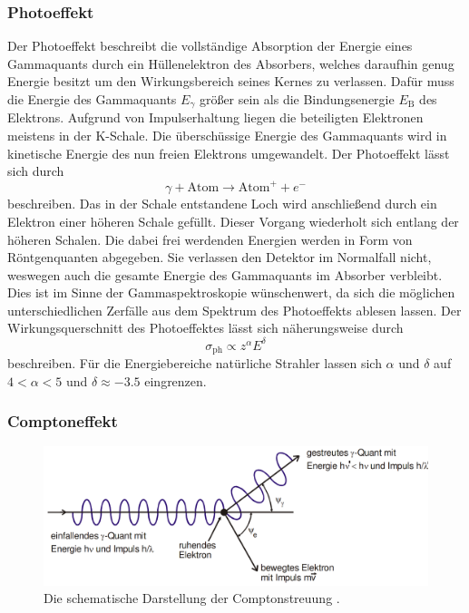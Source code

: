 \subsubsection{Photoeffekt}
Der Photoeffekt beschreibt die vollständige Absorption der Energie eines Gammaquants durch ein Hüllenelektron des Absorbers, welches daraufhin genug Energie besitzt um den Wirkungsbereich seines Kernes zu verlassen. Dafür muss die Energie des Gammaquants $E_\gamma$ größer sein als die Bindungsenergie $E_\text{B}$ des Elektrons. Aufgrund von Impulserhaltung liegen die beteiligten Elektronen meistens in der K-Schale. Die überschüssige Energie des Gammaquants wird in kinetische Energie des nun freien Elektrons umgewandelt. Der Photoeffekt lässt sich durch 
\begin{equation}
    \gamma + \text{Atom} \to \text{Atom}^+ + e^-
\end{equation}
beschreiben. Das in der Schale entstandene Loch wird anschließend durch ein Elektron einer höheren Schale gefüllt. Dieser Vorgang wiederholt sich entlang der höheren Schalen.
Die dabei frei werdenden Energien werden in Form von Röntgenquanten abgegeben. Sie verlassen den Detektor im Normalfall nicht, weswegen auch die gesamte Energie des Gammaquants im Absorber verbleibt. Dies ist im Sinne der Gammaspektroskopie wünschenwert, da sich die möglichen unterschiedlichen Zerfälle aus dem Spektrum des Photoeffekts ablesen lassen.%
Der Wirkungsquerschnitt des Photoeffektes lässt sich näherungsweise durch
\begin{equation}
    \sigma_\text{ph} \propto z^\alpha E^\delta \label{eq:sigp}
\end{equation}
beschreiben. Für die Energiebereiche natürliche Strahler lassen sich $\alpha$ und $\delta$ auf $4 < \alpha <5 $ und $\delta \approx -3.5$ eingrenzen. 

\subsubsection{Comptoneffekt}

\begin{figure}
	\centering
	\includegraphics[width=\linewidth-100pt,height=\textheight-100pt,keepaspectratio]{content/Images/compton.png}
    \caption{Die schematische Darstellung der Comptonstreuung  \cite{V18}.}
    \label{fig:compton}
\end{figure}

